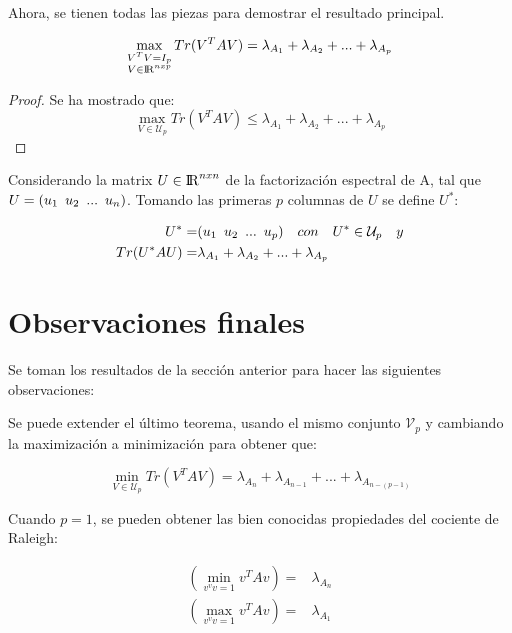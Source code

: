 Ahora, se tienen todas las piezas para demostrar el resultado principal.


\begin{theorem}\label{A1:T2}
\begin{equation*}
\max_{\substack{V^TV= I_p \\V \in {\rm I\!R}^{nxp}}} Tr(V^T A V)	= \lambda_{A_1} + \lambda_{A_2} + ... +\lambda_{A_p}
\end{equation*}
\end{theorem}

\begin{proof}
Se ha mostrado que:
\begin{equation*}
\max_{V \in \mathcal{U}_p} Tr(V^T A V)	\leq \lambda_{A_1} + \lambda_{A_2} + ... +\lambda_{A_p}	
\end{equation*}
\end{proof}

Considerando la matrix $U \in {\rm I\!R}^{nxn}$ de la factorización espectral de A, tal que $U = (u_1 \enskip u_2 \enskip ... \enskip u_n)$. Tomando las primeras $p$ columnas de $U$ se define $U^*$:



\begin{equation*}
\begin{aligned}
    U^* =& (u_1 \enskip u_2\enskip ...\enskip u_p) \quad con \quad U^* \in \mathcal{U}_p \quad y \\
	Tr(U^* A U) =& \lambda_{A_1} + \lambda_{A_2} + ... + \lambda_{A_p}
\end{aligned}
\end{equation*}



\section{Observaciones finales}

Se toman los resultados de la sección anterior para hacer las siguientes observaciones:


\begin{remark}
Se puede extender el último teorema, usando el mismo conjunto $\mathcal{V}_p$ y cambiando la maximización a minimización para obtener que:

\begin{equation}\label{A1:6}
\min_{V \in \mathcal{U}_p} Tr(V^T A V)	= \lambda_{A_n} + \lambda_{A_{n-1}} + ... +\lambda_{A_{n-(p-1)}}
\end{equation}
\end{remark}


\begin{remark}
Cuando $p = 1$, se pueden obtener las bien conocidas propiedades del cociente de Raleigh:

\begin{equation}\label{A1:7}
\begin{aligned}
\left(\min_{v^vv = 1} v^T A v	\right)=& \lambda_{A_n} \\
\left(\max_{v^vv = 1} v^T A v	\right)=& \lambda_{A_1}
\end{aligned}
\end{equation}
\end{remark}




